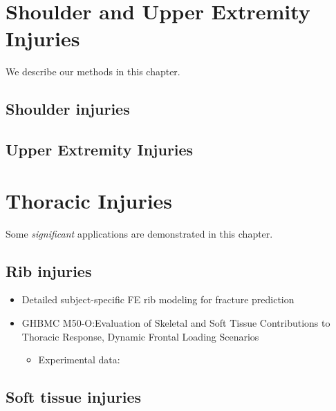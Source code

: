\documentclass[]{book}
\providecommand{\tightlist}{%
  \setlength{\itemsep}{0pt}\setlength{\parskip}{0pt}}
\begin{document}
\hypertarget{shoulder-and-upper-extremity-injuries}{%
\chapter{Shoulder and Upper Extremity Injuries}\label{shoulder-and-upper-extremity-injuries}}

We describe our methods in this chapter.

\hypertarget{shoulder-injuries}{%
\section{Shoulder injuries}\label{shoulder-injuries}}

\hypertarget{upper-extremity-injuries}{%
\section{Upper Extremity Injuries}\label{upper-extremity-injuries}}

\hypertarget{thoracic-injuries}{%
\chapter{Thoracic Injuries}\label{thoracic-injuries}}

Some \emph{significant} applications are demonstrated in this chapter.

\hypertarget{rib-injuries}{%
\section{Rib injuries}\label{rib-injuries}}

\begin{itemize}
\item
  Detailed subject-specific FE rib modeling for fracture prediction \citep{Iraeus2019}
\item
  GHBMC M50-O:Evaluation of Skeletal and Soft Tissue Contributions to Thoracic Response, Dynamic Frontal Loading Scenarios \citep{Ramachandra2019}

  \begin{itemize}
  \tightlist
  \item
    Experimental data: \citep{Murach2018}
  \end{itemize}
\end{itemize}

\hypertarget{soft-tissue-injuries}{%
\section{Soft tissue injuries}\label{soft-tissue-injuries}}
\end{document}
